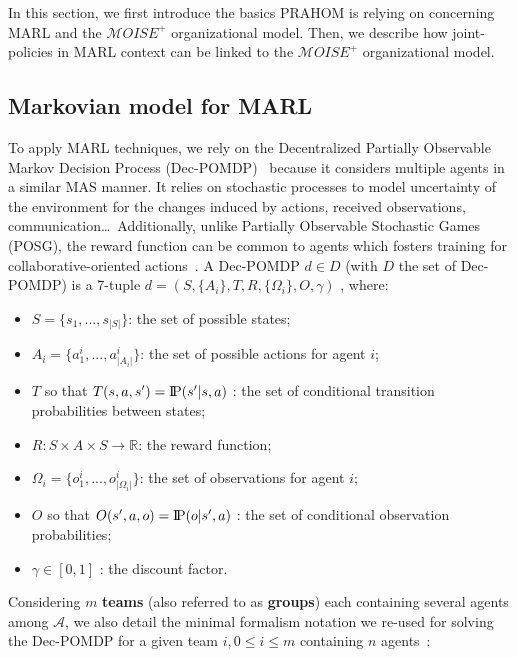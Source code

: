 \documentclass[runningheads]{llncs}
\newcommand{\probP}{\text{I\kern-0.15em P}}
\begin{document}
In this section, we first introduce the basics PRAHOM is relying on concerning MARL and the $\mathcal{M}OISE^{+}$ organizational model. Then, we  describe how joint-policies in MARL context can be linked to the $\mathcal{M}OISE^{+}$ organizational model.

\subsection{Markovian model for MARL}

To apply MARL techniques, we rely on the Decentralized Partially Observable Markov Decision Process (Dec-POMDP)~\cite{Oliehoek2016} because it considers multiple agents in a similar MAS manner. It relies on stochastic processes to model uncertainty of the environment for the changes induced by actions, received observations, communication\dots \ Additionally, unlike Partially Observable Stochastic Games (POSG), the reward function can be common to agents which fosters training for collaborative-oriented actions~\cite{Beynier2013}.
A Dec-POMDP $d \in D$ (with $D$ the set of Dec-POMDP) is a 7-tuple $d = (S,\{A_i\},T,R,\{\Omega_i\},O,\gamma)$ , where:
\begin{itemize}
    \item $S = \{s_1,...,s_{|S|}\}$: the set of possible states;
    \item $A_{i} = \{a_{1}^{i},...,a_{|A_{i}|}^{i}\}$: the set of possible actions for agent $i$;
    \item $T$ so that $T(s,a,s') = \probP{(s'|s,a)}$ : the set of conditional transition probabilities between states;
    \item $R: S \times A \times S \rightarrow \mathbb{R}$: the reward function;
    \item $\Omega_{i} = \{o_{1}^{i},...,o_{|\Omega_{i}|}^{i}\}$: the set of observations for agent $i$;
    \item $O$ so that $O(s',a,o) = \probP{(o|s',a)}$ : the set of conditional observation probabilities;
    \item $\gamma \in [0,1]$ : the discount factor.
\end{itemize}

Considering $m$ \textbf{teams} (also referred to as \textbf{groups}) each containing several agents among $\mathcal{A}$, we also detail the minimal formalism notation we re-used for solving the Dec-POMDP for a given team $i, 0 \leq i \leq m$ containing $n$ agents~\cite{Beynier2013,Albrecht2024}:
\end{document}
